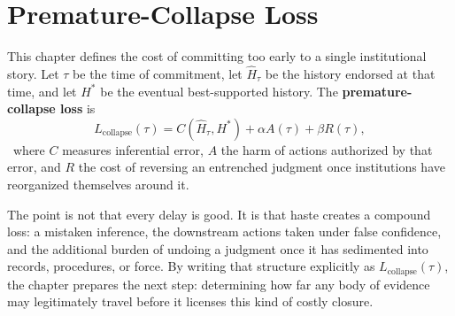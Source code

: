 
\chapter{Premature-Collapse Loss}
\label{ch:ch072}

This chapter defines the cost of committing too early to a single institutional story. Let \(\tau\) be the time of commitment, let \(\widehat H_\tau\) be the history endorsed at that time, and let \(H^\ast\) be the eventual best-supported history. The \textbf{premature-collapse loss} is
\[
L_{\mathrm{collapse}}(\tau)
=
C\!\left(\widehat H_\tau,H^\ast\right)
+
\alpha A(\tau)
+
\beta R(\tau),
\]
\ToyModel\ where \(C\) measures inferential error, \(A\) the harm of actions authorized by that error, and \(R\) the cost of reversing an entrenched judgment once institutions have reorganized themselves around it.

The point is not that every delay is good. It is that haste creates a compound loss: a mistaken inference, the downstream actions taken under false confidence, and the additional burden of undoing a judgment once it has sedimented into records, procedures, or force. By writing that structure explicitly as \(L_{\mathrm{collapse}}(\tau)\), the chapter prepares the next step: determining how far any body of evidence may legitimately travel before it licenses this kind of costly closure.
